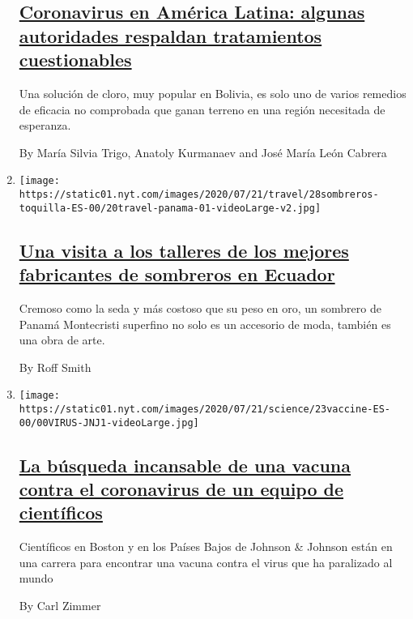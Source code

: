 \begin{enumerate}
  \hypertarget{coronavirus-en-amuxe9rica-latina-algunas-autoridades-respaldan-tratamientos-cuestionables}{%
  \subsection{\texorpdfstring{\href{/es/2020/07/23/espanol/america-latina/bolivia-cloro-coronavirus-ivermectina.html}{Coronavirus
  en América Latina: algunas autoridades respaldan tratamientos
  cuestionables}}{Coronavirus en América Latina: algunas autoridades respaldan tratamientos cuestionables}}\label{coronavirus-en-amuxe9rica-latina-algunas-autoridades-respaldan-tratamientos-cuestionables}}

  Una solución de cloro, muy popular en Bolivia, es solo uno de varios
  remedios de eficacia no comprobada que ganan terreno en una región
  necesitada de esperanza.

  By María Silvia Trigo, Anatoly Kurmanaev and José María León Cabrera
\item
  \texttt{[image: https://static01.nyt.com/images/2020/07/21/travel/28sombreros-toquilla-ES-00/20travel-panama-01-videoLarge-v2.jpg]}

  \hypertarget{una-visita-a-los-talleres-de-los-mejores-fabricantes-de-sombreros-en-ecuador}{%
  \subsection{\texorpdfstring{\href{/es/2020/07/28/espanol/estilos-de-vida/sombreros-toquilla-panama-ecuador.html}{Una
  visita a los talleres de los mejores fabricantes de sombreros en
  Ecuador}}{Una visita a los talleres de los mejores fabricantes de sombreros en Ecuador}}\label{una-visita-a-los-talleres-de-los-mejores-fabricantes-de-sombreros-en-ecuador}}

  Cremoso como la seda y más costoso que su peso en oro, un sombrero de
  Panamá Montecristi superfino no solo es un accesorio de moda, también
  es una obra de arte.

  By Roff Smith
\item
  \texttt{[image: https://static01.nyt.com/images/2020/07/21/science/23vaccine-ES-00/00VIRUS-JNJ1-videoLarge.jpg]}

  \hypertarget{la-buxfasqueda-incansable-de-una-vacuna-contra-el-coronavirus-de-un-equipo-de-cientuxedficos}{%
  \subsection{\texorpdfstring{\href{/es/2020/07/23/espanol/ciencia-y-tecnologia/vacuna-coronavirus.html}{La
  búsqueda incansable de una vacuna contra el coronavirus de un equipo
  de
  científicos}}{La búsqueda incansable de una vacuna contra el coronavirus de un equipo de científicos}}\label{la-buxfasqueda-incansable-de-una-vacuna-contra-el-coronavirus-de-un-equipo-de-cientuxedficos}}

  Científicos en Boston y en los Países Bajos de Johnson \& Johnson
  están en una carrera para encontrar una vacuna contra el virus que ha
  paralizado al mundo

  By Carl Zimmer
\end{enumerate}


